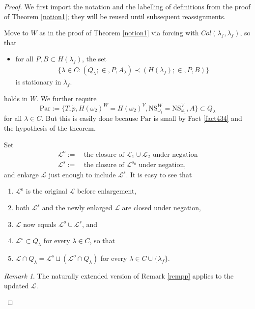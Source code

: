 \documentclass[12pt, twoside]{memoir}
\numberwithin{equation}{section}
\theoremstyle{definition}
\theoremstyle{remark}
\newtheorem{rem}[thm]{Remark}
\theoremstyle{definition}
\theoremstyle{definition}
\theoremstyle{definition}
\theoremstyle{remark}
\begin{document}
\begin{proof}
We first import the notation and the labelling of definitions from the proof of Theorem \ref{notion1}; they will be reused until subsequent reassignments. 

Move to $W$ as in the proof of Theorem \ref{notion1} via forcing with $Col(\lambda_f, \lambda_f)$, so that 
\begin{itemize}[label=($\diamond$)]
    \item for all $P, B \subset H(\lambda_f)$, the set
    \begin{align*}
        \{\lambda \in C : (Q_{\lambda}; \in, P, A_{\lambda}) \prec (H(\lambda_f); \in, P, B)\}
    \end{align*}
    is stationary in $\lambda_f$.
\end{itemize}
holds in $W$. We further require 
\begin{equation*}
    \mathrm{Par} := \{T, \dot{p}, H(\omega_2)^W = H(\omega_2)^V, \mathrm{NS}_{\omega_1}^W = \mathrm{NS}_{\omega_1}^V, A\} \subset Q_{\lambda}
\end{equation*}
for all $\lambda \in C$. But this is easily done because $\mathrm{Par}$ is small by Fact \ref{fact434} and the hypothesis of the theorem. 

Set
\begin{align*}
    \mathcal{L}^o := \ & \text{the closure of } \mathcal{L}_1 \cup \mathcal{L}_2 \text{ under negation} \\
    \mathcal{L}^s := \ & \text{the closure of } \mathcal{L}^{s_0} \text{ under negation},
\end{align*}
and enlarge $\mathcal{L}$ just enough to include $\mathcal{L}^s$. It is easy to see that
\begin{enumerate}[label=(\Alph*)]
    \item\label{33a} $\mathcal{L}^o$ is the original $\mathcal{L}$ before enlargement,
    \item both $\mathcal{L}^s$ and the newly enlarged $\mathcal{L}$ are closed under negation, 
    \item $\mathcal{L}$ now equals $\mathcal{L}^o \cup \mathcal{L}^s$, and
    \item $\mathcal{L}^s \subset Q_{\lambda}$ for every $\lambda \in C$, so that
    \item $\mathcal{L} \cap Q_{\lambda} = \mathcal{L}^s \sqcup (\mathcal{L}^o \cap Q_{\lambda})$ for every $\lambda \in C \cup \{\lambda_f\}$.
\end{enumerate}

\begin{rem}\label{rempp2}
The naturally extended version of Remark \ref{rempp} applies to the updated $\mathcal{L}$.
\end{rem}


\end{proof}
\end{document}
